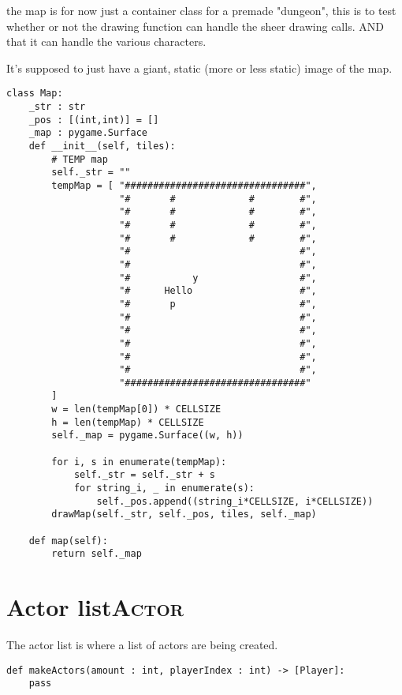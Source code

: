 \documentclass[11pt]{article}
\begin{document}
the map is for now just a container class for a premade "dungeon", this is to test whether or not the drawing function can handle the sheer drawing calls. AND that it can handle the various characters.

It's supposed to just have a giant, static (more or less static) image of the map.

\begin{verbatim}
class Map:
    _str : str
    _pos : [(int,int)] = []
    _map : pygame.Surface
    def __init__(self, tiles):
        # TEMP map
        self._str = ""
        tempMap = [ "################################",
                    "#       #             #        #",
                    "#       #             #        #",
                    "#       #             #        #",
                    "#       #             #        #",
                    "#                              #",
                    "#                              #",
                    "#           y                  #",
                    "#      Hello                   #",
                    "#       p                      #",
                    "#                              #",
                    "#                              #",
                    "#                              #",
                    "#                              #",
                    "#                              #",
                    "################################"
        ]
        w = len(tempMap[0]) * CELLSIZE
        h = len(tempMap) * CELLSIZE
        self._map = pygame.Surface((w, h))
        
        for i, s in enumerate(tempMap):
            self._str = self._str + s
            for string_i, _ in enumerate(s):
                self._pos.append((string_i*CELLSIZE, i*CELLSIZE))
        drawMap(self._str, self._pos, tiles, self._map)

    def map(self):
        return self._map
\end{verbatim}


\section{Actor list\hfill{}\textsc{Actor}}
\label{sec:org5ef3cf5}

The actor list is where a list of actors are being created.

\begin{verbatim}
def makeActors(amount : int, playerIndex : int) -> [Player]:
    pass
\end{verbatim}
\end{document}
